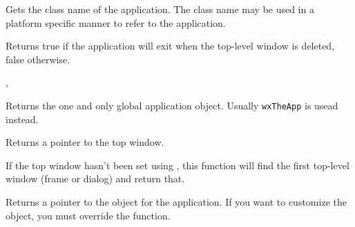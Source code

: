 Gets the class name of the application. The class name may be used in a platform specific
manner to refer to the application.




\label{wxappgetexitonframedelete}


Returns true if the application will exit when the top-level window is deleted, false
otherwise.


,\\


\label{wxappgetinstance}


Returns the one and only global application object.
Usually \texttt{wxTheApp} is usead instead.




\label{wxappgettopwindow}


Returns a pointer to the top window.


If the top window hasn't been set using , this
function will find the first top-level window (frame or dialog) and return that.





\label{wxappgettraits}


Returns a pointer to the  object for the application.
If you want to customize the  object, you must override the
 function.



